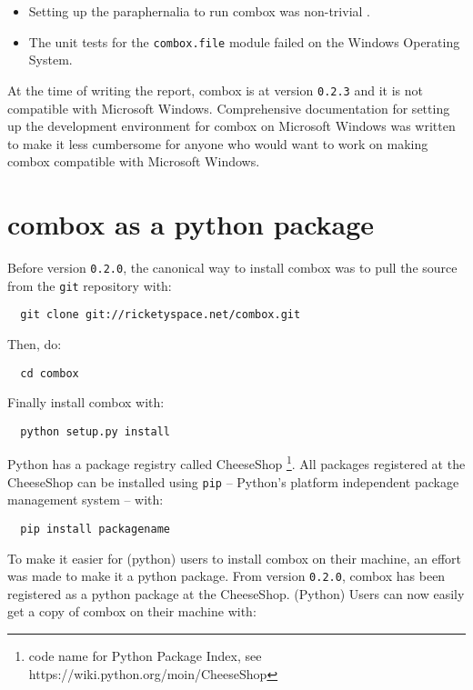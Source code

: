 \begin{itemize}
\item Setting up the paraphernalia to run combox was
  non-trivial \cite{doc:combox-setup-windoze}.
\item The unit tests for the \verb+combox.file+ module failed on the Windows Operating System.
\end{itemize}

At the time of writing the report, combox is at version \verb+0.2.3+
and it is not compatible with Microsoft Windows. Comprehensive
documentation for setting up the development environment for combox on
Microsoft Windows was written \cite{doc:combox-setup-windoze} to make
it less cumbersome for anyone who would want to work on making combox
compatible with Microsoft Windows.

\section{combox as a python package}\label{3-pypi}

Before version \verb+0.2.0+, the canonical way to install combox was
to pull the source from the \verb+git+ repository with:

\begin{verbatim}
  git clone git://ricketyspace.net/combox.git
\end{verbatim}

Then, do:

\begin{verbatim}
  cd combox
\end{verbatim}

Finally install combox with:

\begin{verbatim}
  python setup.py install
\end{verbatim}

Python has a package registry called CheeseShop \footnote{code name for
  Python Package Index, see https://wiki.python.org/moin/CheeseShop}.
All packages registered at the CheeseShop can be installed using
\verb+pip+ -- Python's platform independent package management
system\cite{py:pip} -- with:

\begin{verbatim}
  pip install packagename
\end{verbatim}

To make it easier for (python) users to install combox on their
machine, an effort was made to make it a python
package\cite{py:package-guide}. From version \verb+0.2.0+, combox has
been registered as a python package at the CheeseShop. (Python) Users
can now easily get a copy of combox on their machine with:

